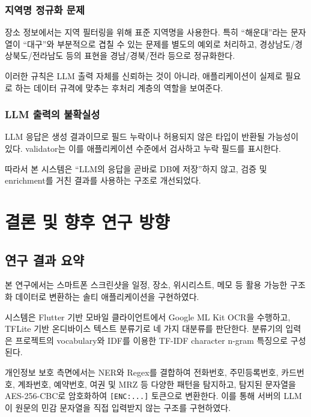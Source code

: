 \documentclass[11pt,a4paper]{article}
\begin{document}
\subsubsection{지역명 정규화 문제}

장소 정보에서는 지역 필터링을 위해 표준 지역명을 사용한다. 특히 ``해운대''라는 문자열이 ``대구''와 부분적으로 겹칠 수 있는 문제를 별도의 예외로 처리하고, 경상남도/경상북도/전라남도 등의 표현을 경남/경북/전라 등으로 정규화한다.

이러한 규칙은 LLM 출력 자체를 신뢰하는 것이 아니라, 애플리케이션이 실제로 필요로 하는 데이터 규격에 맞추는 후처리 계층의 역할을 보여준다.

\subsubsection{LLM 출력의 불확실성}

LLM 응답은 생성 결과이므로 필드 누락이나 허용되지 않은 타입이 반환될 가능성이 있다. validator는 이를 애플리케이션 수준에서 검사하고 누락 필드를 표시한다.

따라서 본 시스템은 ``LLM의 응답을 곧바로 DB에 저장''하지 않고, 검증 및 enrichment를 거친 결과를 사용하는 구조로 개선되었다.

\newpage

\section{결론 및 향후 연구 방향}

\subsection{연구 결과 요약}

본 연구에서는 스마트폰 스크린샷을 일정, 장소, 위시리스트, 메모 등 활용 가능한 구조화 데이터로 변환하는 솔티 애플리케이션을 구현하였다.

시스템은 Flutter 기반 모바일 클라이언트에서 Google ML Kit OCR을 수행하고, TFLite 기반 온디바이스 텍스트 분류기로 네 가지 대분류를 판단한다. 분류기의 입력은 프로젝트의 vocabulary와 IDF를 이용한 TF-IDF character n-gram 특징으로 구성된다.

개인정보 보호 측면에서는 NER와 Regex를 결합하여 전화번호, 주민등록번호, 카드번호, 계좌번호, 예약번호, 여권 및 MRZ 등 다양한 패턴을 탐지하고, 탐지된 문자열을 AES-256-CBC로 암호화하여 \texttt{[ENC:...]} 토큰으로 변환한다. 이를 통해 서버의 LLM이 원문의 민감 문자열을 직접 입력받지 않는 구조를 구현하였다.
\end{document}
